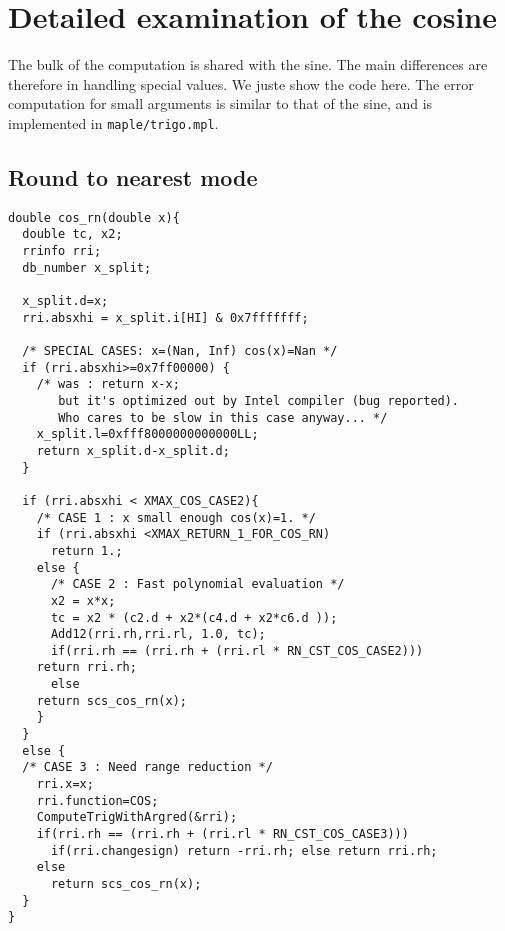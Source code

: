\section{Detailed examination of the cosine}
The bulk of the computation is shared with the sine.  The main
differences are therefore in handling special values. We juste show
the code here. The error computation for small arguments is similar to
that of the sine, and is implemented in \texttt{maple/trigo.mpl}.

\subsection{Round to nearest mode}
\begin{lstlisting}[caption={Exceptional cases for cosine RN},firstnumber=1]
double cos_rn(double x){ 
  double tc, x2;
  rrinfo rri;
  db_number x_split;

  x_split.d=x;
  rri.absxhi = x_split.i[HI] & 0x7fffffff;

  /* SPECIAL CASES: x=(Nan, Inf) cos(x)=Nan */
  if (rri.absxhi>=0x7ff00000) {
    /* was : return x-x; 
       but it's optimized out by Intel compiler (bug reported).
       Who cares to be slow in this case anyway... */
    x_split.l=0xfff8000000000000LL;
    return x_split.d-x_split.d;
  }

  if (rri.absxhi < XMAX_COS_CASE2){
    /* CASE 1 : x small enough cos(x)=1. */
    if (rri.absxhi <XMAX_RETURN_1_FOR_COS_RN)
      return 1.;
    else {
      /* CASE 2 : Fast polynomial evaluation */
      x2 = x*x;
      tc = x2 * (c2.d + x2*(c4.d + x2*c6.d ));
      Add12(rri.rh,rri.rl, 1.0, tc);
      if(rri.rh == (rri.rh + (rri.rl * RN_CST_COS_CASE2)))	
	return rri.rh;
      else
	return scs_cos_rn(x); 
    }
  }
  else {
  /* CASE 3 : Need range reduction */ 
    rri.x=x;
    rri.function=COS;
    ComputeTrigWithArgred(&rri);
    if(rri.rh == (rri.rh + (rri.rl * RN_CST_COS_CASE3)))	
      if(rri.changesign) return -rri.rh; else return rri.rh;
    else
      return scs_cos_rn(x); 
  }
}
\end{lstlisting}

